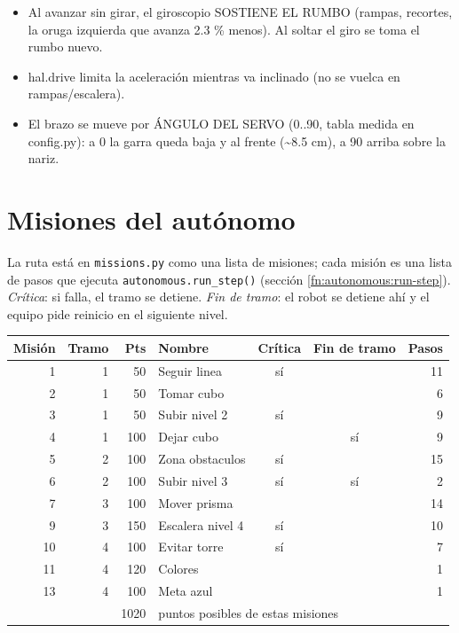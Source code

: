 \begin{itemize}\setlength\itemsep{0pt}
\item Al avanzar sin girar, el giroscopio SOSTIENE EL RUMBO (rampas, recortes, la oruga izquierda que avanza 2.3 \% menos). Al soltar el giro se toma el rumbo nuevo.
\item hal.drive limita la aceleración mientras va inclinado (no se vuelca en rampas/escalera).
\item El brazo se mueve por ÁNGULO DEL SERVO (0..90\textdegree{}, tabla medida en config.py): a 0\textdegree{} la garra queda baja y al frente (\textasciitilde{}8.5 cm), a 90\textdegree{} arriba sobre la nariz.
\end{itemize}
\section{Misiones del aut\'onomo}
La ruta est\'a en \texttt{missions.py} como una lista de misiones; cada misi\'on es una lista de pasos que ejecuta \texttt{autonomous.run\_step()} (secci\'on \ref{fn:autonomous:run-step}). \emph{Cr\'itica}: si falla, el tramo se detiene. \emph{Fin de tramo}: el robot se detiene ah\'i y el equipo pide reinicio en el siguiente nivel.
\begin{longtable}{@{}rrrlccr@{}}\toprule
\textbf{Misi\'on} & \textbf{Tramo} & \textbf{Pts} & \textbf{Nombre} & \textbf{Cr\'itica} & \textbf{Fin de tramo} & \textbf{Pasos} \\\midrule\endhead
1 & 1 & 50 & Seguir linea & s\'i &  & 11 \\
2 & 1 & 50 & Tomar cubo &  &  & 6 \\
3 & 1 & 50 & Subir nivel 2 & s\'i &  & 9 \\
4 & 1 & 100 & Dejar cubo &  & s\'i & 9 \\
5 & 2 & 100 & Zona obstaculos & s\'i &  & 15 \\
6 & 2 & 100 & Subir nivel 3 & s\'i & s\'i & 2 \\
7 & 3 & 100 & Mover prisma &  &  & 14 \\
9 & 3 & 150 & Escalera nivel 4 & s\'i &  & 10 \\
10 & 4 & 100 & Evitar torre & s\'i &  & 7 \\
11 & 4 & 120 & Colores &  &  & 1 \\
13 & 4 & 100 & Meta azul &  &  & 1 \\
\midrule & & 1020 & \multicolumn{4}{l}{puntos posibles de estas misiones} \\
\bottomrule\end{longtable}
